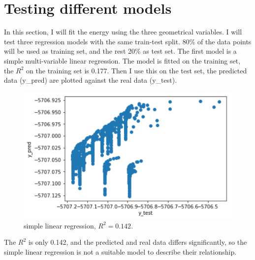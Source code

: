 \documentclass[11pt]{article}
\begin{document}
\section{Testing different models}\label{section-model}
In this section, I will fit the energy using the three geometrical variables.
I will test three regression models with the same train-test split.
80\% of the data points will be used as training set, and the rest 20\% as test set.
The first model is a simple multi-variable linear regression.
The model is fitted on the training set, the $R^2$ on the training set is 0.177.
Then I use this on the test set, the predicted data (y\_pred) are plotted against the real data (y\_test).
\begin{figure}[h]
\centerline{\includegraphics[scale=0.6]{fit1.png}}
\caption{simple linear regression, $R^2=0.142$.}
\end{figure}
The $R^2$ is only 0.142, and the predicted and real data differs significantly, so the simple linear regression is not a suitable model to describe their relationship.

\newpage
\end{document}
